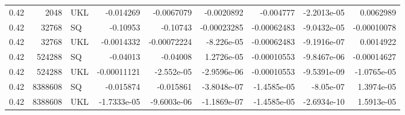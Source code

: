 \begin{tabular}{rrlrrrrrr}
0.42 & 2048 & UKL & -0.014269 & -0.0067079 & -0.0020892 & -0.004777 & -2.2013e-05 & 0.0062989 \\
0.42 & 32768 & SQ & -0.10953 & -0.10743 & -0.00023285 & -0.00062483 & -9.0432e-05 & -0.00010078 \\
0.42 & 32768 & UKL & -0.0014332 & -0.00072224 & -8.226e-05 & -0.00062483 & -9.1916e-07 & 0.0014922 \\
0.42 & 524288 & SQ & -0.04013 & -0.04008 & 1.2726e-05 & -0.00010553 & -9.8467e-06 & -0.00014627 \\
0.42 & 524288 & UKL & -0.00011121 & -2.552e-05 & -2.9596e-06 & -0.00010553 & -9.5391e-09 & -1.0765e-05 \\
0.42 & 8388608 & SQ & -0.015874 & -0.015861 & -3.8048e-07 & -1.4585e-05 & -8.05e-07 & 1.3974e-05 \\
0.42 & 8388608 & UKL & -1.7333e-05 & -9.6003e-06 & -1.1869e-07 & -1.4585e-05 & -2.6934e-10 & 1.5913e-05 \\
\bottomrule
\end{tabular}
